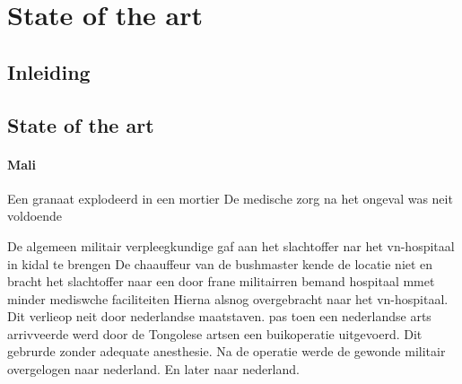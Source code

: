 





 
\chapter{State of the art}


\section{Inleiding}
 

\section{State of the art}
 
 
   
   
   
   
   
   
   
   
   
   
   
    
   
   
   
   
   
   
   
   
   
   




\subsubsection{Mali}
Een granaat explodeerd in een mortier
De medische zorg na het ongeval was neit voldoende


De algemeen militair verpleegkundige gaf aan het slachtoffer nar het vn-hospitaal in kidal te brengen
De chaauffeur van de bushmaster kende de locatie niet  en bracht het slachtoffer naar een door frane militairren bemand hospitaal mmet minder mediswche faciliteiten
Hierna alsnog overgebracht naar het vn-hospitaal.
Dit verlieop  neit door nederlandse maatstaven.
pas toen een nederlandse arts arrivveerde werd door de Tongolese artsen een buikoperatie uitgevoerd.
Dit gebrurde zonder adequate anesthesie.
Na de operatie werde de gewonde militair overgelogen naar nederland. En later naar nederland.


